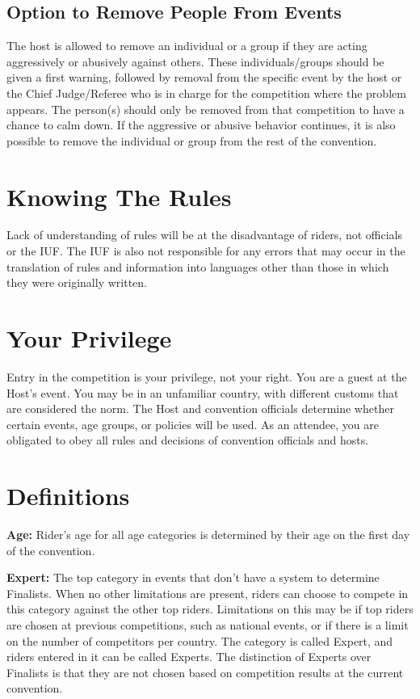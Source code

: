 \subsection{Option to Remove People From Events}
The host is allowed to remove an individual or a group if they are acting aggressively or abusively against others.
These individuals/groups should be given a first warning, followed by removal from the specific event by the host or the Chief Judge/Referee who is in charge for the competition where the problem appears.
The person(s) should only be removed from that competition to have a chance to calm down.
If the aggressive or abusive behavior continues, it is also possible to remove the individual or group from the rest of the convention.

\section{Knowing The Rules}
Lack of understanding of rules will be at the disadvantage of riders, not officials or the IUF.
The IUF is also not responsible for any errors that may occur in the translation of rules and information into languages other than those in which they were originally written.

\section{Your Privilege}
Entry in the competition is your privilege, not your right.
You are a guest at the Host's event.
You may be in an unfamiliar country, with different customs that are considered the norm.
The Host and convention officials determine whether certain events, age groups, or policies will be used.
As an attendee, you are obligated to obey all rules and decisions of convention officials and hosts.

\section{Definitions \label{sec:general_definitions}}
\textbf{Age:} Rider's age for all age categories is determined by their age on the first day of the convention.

\textbf{Expert:} The top category in events that don't have a system to determine Finalists.
When no other limitations are present, riders can choose to compete in this category against the other top riders.
Limitations on this may be if top riders are chosen at previous competitions, such as national events, or if there is a limit on the number of competitors per country.
The category is called Expert, and riders entered in it can be called Experts.
The distinction of Experts over Finalists is that they are not chosen based on competition results at the current convention.

